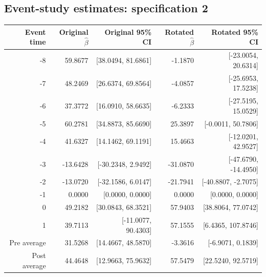\documentclass[10pt]{article}
\begin{document}
\subsection*{Event-study estimates: specification 2}
\begin{center}\scriptsize
\begin{tabular}{r rr rr}
\toprule
Event time & Original $\hat\beta$ & Original 95\% CI & Rotated $\hat\beta$ & Rotated 95\% CI \\
\midrule
-8 & 59.8677 & [38.0494, 81.6861] & -1.1870 & [-23.0054, 20.6314] \\
-7 & 48.2469 & [26.6374, 69.8564] & -4.0857 & [-25.6953, 17.5238] \\
-6 & 37.3772 & [16.0910, 58.6635] & -6.2333 & [-27.5195, 15.0529] \\
-5 & 60.2781 & [34.8873, 85.6690] & 25.3897 & [-0.0011, 50.7806] \\
-4 & 41.6327 & [14.1462, 69.1191] & 15.4663 & [-12.0201, 42.9527] \\
-3 & -13.6428 & [-30.2348, 2.9492] & -31.0870 & [-47.6790, -14.4950] \\
-2 & -13.0720 & [-32.1586, 6.0147] & -21.7941 & [-40.8807, -2.7075] \\
-1 & 0.0000 & [0.0000, 0.0000] & 0.0000 & [0.0000, 0.0000] \\
0 & 49.2182 & [30.0843, 68.3521] & 57.9403 & [38.8064, 77.0742] \\
1 & 39.7113 & [-11.0077, 90.4303] & 57.1555 & [6.4365, 107.8746] \\
\midrule
Pre average & 31.5268 & [14.4667, 48.5870] & -3.3616 & [-6.9071, 0.1839] \\
Post average & 44.4648 & [12.9663, 75.9632] & 57.5479 & [22.5240, 92.5719] \\
\bottomrule
\end{tabular}
\end{center}
\clearpage
\end{document}

